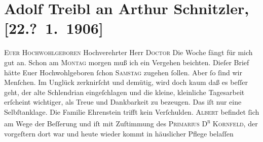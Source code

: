 

         
         \renewcommand{\erwaehntePersonen}{Personen: Alexander Ehrenstein, Charlotte Ehrenstein, Albert Ehrenstein, Johann Gottfried von Herder, Sigmund Kornfeld, Adolf Treibl}
         \renewcommand{\erwaehnteOrte}{Orte: Wien}
         \renewcommand{\erwaehnteWerke}{}
               \section[Adolf Treibl an Arthur Schnitzler, {[}22.? 1. 1906{]}]{ Adolf Treibl an Arthur Schnitzler, {[}22.? 1. 1906{]}}\nopagebreak{}\rehead{ }\begin{ledgroupsized}[t]{13cm}\normalsize\beginnumbering{} \toendnotes[C]{\smallbreak\pagebreak[2]} 
\toendnotes[C]{\smallbreak}\pstart
           \noindent{}{\pb}\textsc{Euer Hochwohlgeboren}\pend
           \pstart{}Hochverehrter Herr \textsc{Doctor}\pend\pstart
           Die Woche fängt für mich gut an. Schon am \textsc{Montag}{ }morgen muß ich ein Vergehen beichten. Dieſer Brief hätte Euer
               Hochwohlgeboren ſchon \textsc{Samstag} zugehen ſollen. Aber ſo ſind wir Menſchen. Im Unglück zerknirſcht und
               demütig, wird doch {\pb}kaum daß es beſſer geht, der alte
               Schlendrian eingeſchlagen und die kleine, kleinliche Tagesarbeit erſcheint wichtiger,
               als Treue und Dankbarkeit zu bezeugen. Das iſt nur eine Selbſtanklage. Die Familie
                  Ehrenstein trifft kein
               Verſchulden.\pend
           \pstart
           \textsc{Albert} befindet ſich am Wege der Beſſerung und iſt mit Zuſtimmung des \textsc{Prima{\pb}rius D\textsuperscript{r}}{ }\textsc{Kornfeld}, der vorgeſtern dort war und heute wieder kommt in häuslicher Pflege belaſſen

\end{ledgroupsized}
